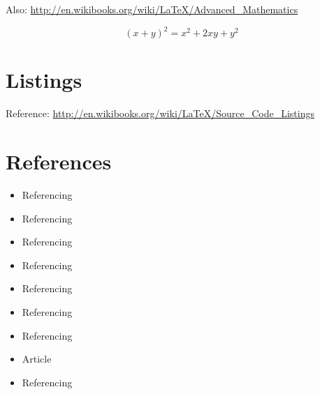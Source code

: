 \documentclass{projetofinal-dcc}
\begin{document}
Also: \url{http://en.wikibooks.org/wiki/LaTeX/Advanced\_Mathematics}

\begin{equation}
  (x + y)^2 = x^2 + 2xy + y^2
  \label{eq:LABEL_EQ_1}
\end{equation}

\section{Listings}\label{sec:LABEL_CHP_2_SEC_D}
Reference: \url{http://en.wikibooks.org/wiki/LaTeX/Source_Code_Listings}



\section{References}\label{sec:LABEL_CHP_2_SEC_E}
\begin{itemize}
  \item Referencing 
  \item Referencing 
  \item Referencing 
  \item Referencing 
  \item Referencing 
  \item Referencing 
  \item Referencing 
  \item Article \cite{art:REF_ART_1}
  \item Referencing 
\end{itemize}

\pagebreak



\end{document}
